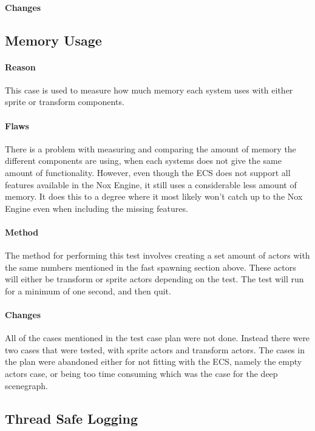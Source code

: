 \paragraph{Changes}

\subsection{Memory Usage}
\paragraph{Reason}
This case is used to measure how much memory each system uses with either sprite or transform components.

\paragraph{Flaws}
There is a problem with measuring and comparing the amount of memory the different components are using, when each systems does not give the same amount of functionality.
However, even though the ECS does not support all features available in the Nox Engine, it still uses a considerable less amount of memory.
It does this to a degree where it most likely won't catch up to the Nox Engine even when including the missing features.

\paragraph{Method}
The method for performing this test involves creating a set amount of actors with the same numbers mentioned in the fast spawning section above.
These actors will either be transform or sprite actors depending on the test.
The test will run for a minimum of one second, and then quit.

\paragraph{Changes}
All of the cases mentioned in the test case plan were not done.
Instead there were two cases that were tested, with sprite actors and transform actors.
The cases in the plan were abandoned either for not fitting with the ECS, namely the empty actors case, or being too time consuming which was the case for the deep scenegraph.

\subsection{Thread Safe Logging}

